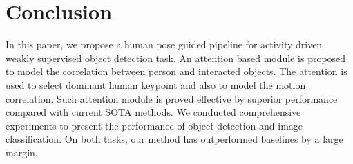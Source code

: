 \section{Conclusion}
In this paper, we propose a human pose guided pipeline for activity driven weakly supervised object detection task. An attention based module is proposed to model the correlation between person and interacted objects. The attention is used to select dominant human keypoint and also to model the motion correlation. Such attention module is proved effective by superior performance compared with current SOTA methods. We conducted comprehensive experiments to present the performance of object detection and image classification. On both tasks, our method has outperformed baselines by a large margin. 